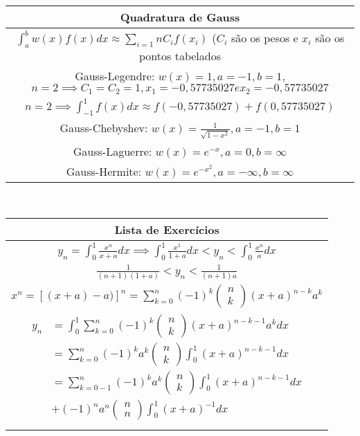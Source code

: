 \documentclass{article}
\begin{document}
\begin{tabular}{c}
Quadratura de Gauss\\
\hline
$ \displaystyle \int_a^b w(x)f(x)dx \approx \displaystyle \sum_{i=1}{n} C_if(x_i) $ ($C_i$ são os pesos e $x_i$ são os pontos tabelados \\
\hline
Gauss-Legendre: $w(x)=1, a=-1, b=1$, $n=2 \implies C_1 = C_2 = 1, x_1 =-0,57735027 e x_2 = -0,57735027$\\
$ n=2 \implies \displaystyle \int_{-1}^1 f(x)dx \approx f(-0,57735027) + f(0,57735027) $\\
Gauss-Chebyshev: $w(x) = \frac{1}{\sqrt{1-x^2}}, a=-1, b=1$ \\
Gauss-Laguerre: $ w(x) = e^{-x}, a=0, b=\infty$\\
Gauss-Hermite: $ w(x) = e^{-x^2}, a=-\infty, b=\infty$\\
\end{tabular}\\
\begin{tabular}{c}
Lista de Exercícios\\
\hline

$ y_n = \int_0^1 \frac{x^n}{x+a} dx \implies \int_0^1 \frac{x^1}{1+a}dx < y_n < \int_0^1 \frac{x^n}{a}dx$\\
$ \frac{1}{(n+1)(1+a)} < y_n < \frac{1}{(n+1)a}$\\
$ x^n = [(x+a)-a)]^n = \displaystyle\sum_{k=0}^{n} (-1)^k \left( \begin{array}{c}
n\\
k
\end{array}
\right) (x+a)^{n-k}a^k$\\
$\begin{aligned}
 y_n &= \displaystyle \int_0^1 \displaystyle \sum_{k=0}^{n} (-1)^k \left( \begin{array}{c}
n\\
k
\end{array}
\right) (x+a)^{n-k-1}a^k dx\\

&= \displaystyle \sum_{k=0}^{n} (-1)^k a^k \left( \begin{array}{c}
n\\
k
\end{array}
\right) \displaystyle \int_0^1 (x+a)^{n-k-1} dx\\


&= \displaystyle \sum_{k=0-1}^{n} (-1)^k a^k \left( \begin{array}{c}
n\\
k
\end{array}
\right) \displaystyle \int_0^1 (x+a)^{n-k-1} dx\\
&+ (-1)^n a^n \left( \begin{array}{c}
n\\
n
\end{array}
\right) \displaystyle \int_0^1 (x+a)^{-1}dx\\

\end{aligned}

$

\end{tabular}
\end{document}
